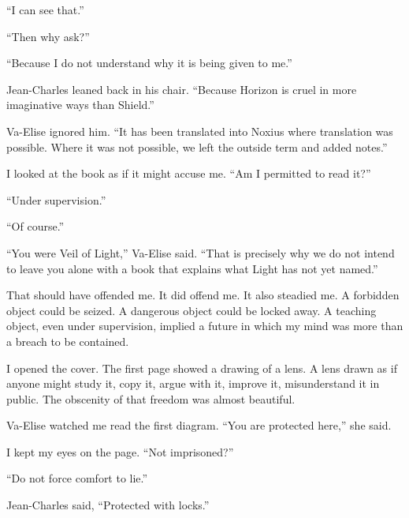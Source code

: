 ``I can see that.''\par

``Then why ask?''\par

``Because I do not understand why it is being given to me.''\par

Jean-Charles leaned back in his chair. ``Because Horizon is cruel in more imaginative ways than Shield.''\par

Va-Elise ignored him. ``It has been translated into Noxius where translation was possible. Where it was not possible, we left the outside term and added notes.''\par

I looked at the book as if it might accuse me. ``Am I permitted to read it?''\par

``Under supervision.''\par

``Of course.''\par

``You were Veil of Light,'' Va-Elise said. ``That is precisely why we do not intend to leave you alone with a book that explains what Light has not yet named.''\par

That should have offended me. It did offend me. It also steadied me. A forbidden object could be seized. A dangerous object could be locked away. A teaching object, even under supervision, implied a future in which my mind was more than a breach to be contained.\par

I opened the cover. The first page showed a drawing of a lens. A lens drawn as if anyone might study it, copy it, argue with it, improve it, misunderstand it in public. The obscenity of that freedom was almost beautiful.\par

Va-Elise watched me read the first diagram. ``You are protected here,'' she said.\par

I kept my eyes on the page. ``Not imprisoned?''\par

``Do not force comfort to lie.''\par

Jean-Charles said, ``Protected with locks.''\par

